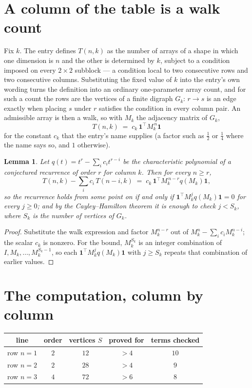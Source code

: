 \documentclass[11pt,a4paper]{article}
\theoremstyle{plain}
\newtheorem{lemma}[theorem]{Lemma}
\theoremstyle{definition}
\begin{document}
\section{A column of the table is a walk count}

Fix $k$. The entry defines $T(n,k)$ as the number of arrays of a shape in which one dimension
is $n$ and the other is determined by $k$, subject to a condition imposed on every
$2\times2$ subblock --- a condition local to two consecutive rows and two consecutive columns.
Substituting the fixed value of $k$ into the entry's own wording turns the definition into an
ordinary one-parameter array count, and for such a count the rows are the vertices of a finite
digraph $G_k$: $r\to s$ is an edge exactly when placing $s$ under $r$ satisfies the condition
in every column pair. An admissible array is then a walk, so with $M_k$ the adjacency matrix
of $G_k$,
\[
T(n,k)\;=\;c_k\,\mathbf{1}^{\!\top}M_k^{\,n}\mathbf{1}
\]
for the constant $c_k$ that the entry's name supplies (a factor such as $\tfrac12$ or
$\tfrac14$ where the name says so, and $1$ otherwise).

\begin{lemma}\label{lem:crit}
Let $q(t)=t^{r}-\sum_i c_it^{r-i}$ be the characteristic polynomial of a conjectured
recurrence of order $r$ for column $k$. Then for every $n\ge r$,
\[
T(n,k)-\sum_i c_i\,T(n-i,k)\;=\;c_k\,\mathbf{1}^{\!\top}M_k^{\,n-r}q(M_k)\mathbf{1},
\]
so the recurrence holds from some point on if and only if
$\mathbf{1}^{\!\top}M_k^{j}q(M_k)\mathbf{1}=0$ for every $j\ge0$; and by the
Cayley--Hamilton theorem it is enough to check $j<S_k$, where $S_k$ is the number of vertices
of $G_k$.
\end{lemma}

\begin{proof}
Substitute the walk expression and factor $M_k^{n-r}$ out of $M_k^{n}-\sum_ic_iM_k^{n-i}$;
the scalar $c_k$ is nonzero. For the bound, $M_k^{S_k}$ is an integer combination of
$I,M_k,\dots,M_k^{S_k-1}$, so each $\mathbf{1}^{\!\top}M_k^{j}q(M_k)\mathbf{1}$ with
$j\ge S_k$ repeats that combination of earlier values.
\end{proof}

\section{The computation, column by column}

\begin{center}
\begin{tabular}{ccccc}
line & order & vertices $S$ & proved for & terms checked \\ \hline
row $n$$=1$ & $2$ & $12$ & $>4$ & $10$ \\
row $n$$=2$ & $2$ & $28$ & $>4$ & $9$ \\
row $n$$=3$ & $4$ & $72$ & $>6$ & $8$ \\
\end{tabular}
\end{center}
\end{document}
